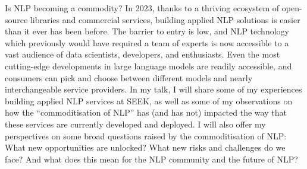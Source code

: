 Is NLP becoming a commodity? In 2023, thanks to a thriving ecosystem of open-source libraries and commercial services, building applied NLP solutions is easier than it ever has been before. The barrier to entry is low, and NLP technology which previously would have required a team of experts is now accessible to a vast audience of data scientists, developers, and enthusiasts. Even the most cutting-edge developments in large language models are readily accessible, and consumers can pick and choose between different models and nearly interchangeable service providers. In my talk, I will share some of my experiences building applied NLP services at SEEK, as well as some of my observations on how the “commoditisation of NLP” has (and has not) impacted the way that these services are currently developed and deployed. I will also offer my perspectives on some broad questions raised by the commoditisation of NLP: What new opportunities are unlocked? What new risks and challenges do we face? And what does this mean for the NLP community and the future of NLP?
